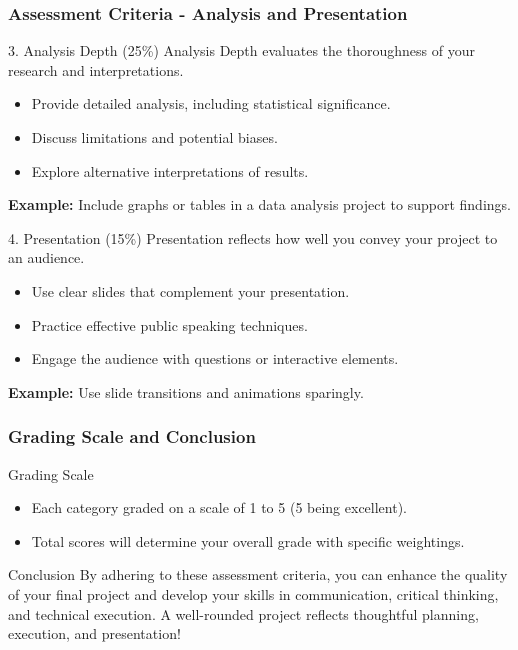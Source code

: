 \documentclass[aspectratio=169]{beamer}
\begin{document}
\begin{frame}[fragile]
    \frametitle{Assessment Criteria - Analysis and Presentation}
    \begin{block}{3. Analysis Depth (25\%)}
        Analysis Depth evaluates the thoroughness of your research and interpretations.
        \begin{itemize}
            \item Provide detailed analysis, including statistical significance.
            \item Discuss limitations and potential biases.
            \item Explore alternative interpretations of results.
        \end{itemize}
        \textbf{Example:} Include graphs or tables in a data analysis project to support findings.
    \end{block}
    
    \begin{block}{4. Presentation (15\%)}
        Presentation reflects how well you convey your project to an audience.
        \begin{itemize}
            \item Use clear slides that complement your presentation.
            \item Practice effective public speaking techniques.
            \item Engage the audience with questions or interactive elements.
        \end{itemize}
        \textbf{Example:} Use slide transitions and animations sparingly.
    \end{block}
\end{frame}

\begin{frame}[fragile]
    \frametitle{Grading Scale and Conclusion}
    \begin{block}{Grading Scale}
        \begin{itemize}
            \item Each category graded on a scale of 1 to 5 (5 being excellent).
            \item Total scores will determine your overall grade with specific weightings.
        \end{itemize}
    \end{block}
    
    \begin{block}{Conclusion}
        By adhering to these assessment criteria, you can enhance the quality of your final project and develop your skills in communication, critical thinking, and technical execution. A well-rounded project reflects thoughtful planning, execution, and presentation!
    \end{block}
\end{frame}
\end{document}

